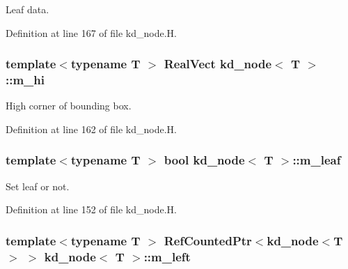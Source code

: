Leaf data. 



Definition at line 167 of file kd\+\_\+node.\+H.

\subsubsection[{\texorpdfstring{m\+\_\+hi}{m_hi}}]{\setlength{\rightskip}{0pt plus 5cm}template$<$typename T $>$ Real\+Vect {\bf kd\+\_\+node}$<$ T $>$\+::m\+\_\+hi\hspace{0.3cm}{\ttfamily [protected]}}\hypertarget{classkd__node_ad471be790fdc008625da736b924df21d}{}\label{classkd__node_ad471be790fdc008625da736b924df21d}


High corner of bounding box. 



Definition at line 162 of file kd\+\_\+node.\+H.

\subsubsection[{\texorpdfstring{m\+\_\+leaf}{m_leaf}}]{\setlength{\rightskip}{0pt plus 5cm}template$<$typename T $>$ bool {\bf kd\+\_\+node}$<$ T $>$\+::m\+\_\+leaf\hspace{0.3cm}{\ttfamily [protected]}}\hypertarget{classkd__node_adeb75a3c3913331b6fc9a7fba623243f}{}\label{classkd__node_adeb75a3c3913331b6fc9a7fba623243f}


Set leaf or not. 



Definition at line 152 of file kd\+\_\+node.\+H.

\subsubsection[{\texorpdfstring{m\+\_\+left}{m_left}}]{\setlength{\rightskip}{0pt plus 5cm}template$<$typename T $>$ Ref\+Counted\+Ptr$<${\bf kd\+\_\+node}$<$T$>$ $>$ {\bf kd\+\_\+node}$<$ T $>$\+::m\+\_\+left\hspace{0.3cm}{\ttfamily [protected]}}\hypertarget{classkd__node_ae7f6e2c3ae60c874e1dae4dc51bc404c}{}\label{classkd__node_ae7f6e2c3ae60c874e1dae4dc51bc404c}



